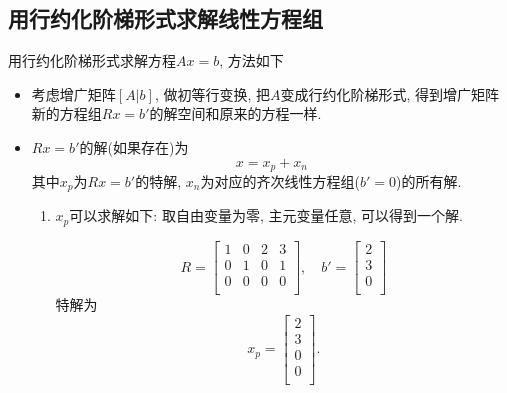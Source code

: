 
\subsection{用行约化阶梯形式求解线性方程组}
用行约化阶梯形式求解方程$Ax = b$, 方法如下

\begin{itemize}
    \item 考虑增广矩阵$[A|b]$, 做初等行变换, 把$A$变成行约化阶梯形式, 得到增广矩阵
    \begin{equation}
      [R|b']
    \end{equation}
    新的方程组$Rx = b'$的解空间和原来的方程一样.

    \item $Rx = b'$的解(如果存在)为
    \begin{equation}
      x=x_p+x_n
    \end{equation}
    其中$x_p$为$Rx = b'$的特解, $x_n$为对应的齐次线性方程组($b'=0$)的所有解.
    \begin{enumerate}
        \item $x_p$可以求解如下: 取自由变量为零, 主元变量任意, 可以得到一个解.
        \begin{example}
            \begin{equation}
              R = \begin{bmatrix}
               1 & 0 & 2 & 3\\
               0 & 1 & 0 & 1\\
               0 & 0 & 0 & 0\\
              \end{bmatrix}
              , \quad
              b' = \begin{bmatrix}
               2\\
               3\\
               0\\
              \end{bmatrix}
            \end{equation}
            特解为
            \begin{equation}
              x_p=\begin{bmatrix}
               2\\
               3\\
               0\\
               0\\
              \end{bmatrix}.
            \end{equation}
        \end{example}


\end{enumerate}
\end{itemize}
